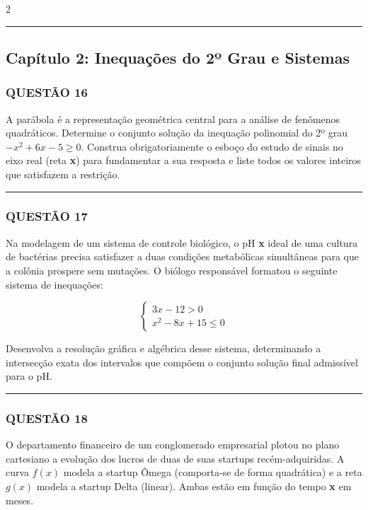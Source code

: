 \documentclass[twoside, 10pt, a4paper]{article}
\begin{document}
\begin{multicols*}{2}
\vspace{0cm} \noindent\textcolor{CorLinha}{\rule{\linewidth}{0.5pt}} \vspace{-0.2cm}
\subsection*{Capítulo 2: Inequações do 2º Grau e Sistemas}
\subsubsection*{QUESTÃO 16}
A parábola é a representação geométrica central para a análise de fenômenos quadráticos. Determine o conjunto solução da inequação polinomial do 2º grau $ -x^2 + 6x - 5 \ge 0 $. Construa obrigatoriamente o esboço do estudo de sinais no eixo real (reta \textbf{x}) para fundamentar a sua resposta e liste todos os valores inteiros que satisfazem a restrição.

\vspace{0cm} \noindent\textcolor{CorLinha}{\rule{\linewidth}{0.5pt}} \vspace{-0.2cm}
\subsubsection*{QUESTÃO 17}
Na modelagem de um sistema de controle biológico, o pH \textbf{x} ideal de uma cultura de bactérias precisa satisfazer a duas condições metabólicas simultâneas para que a colônia prospere sem mutações. O biólogo responsável formatou o seguinte sistema de inequações:

$$ \begin{cases} 3x - 12 > 0 \\ x^2 - 8x + 15 \le 0 \end{cases} $$

Desenvolva a resolução gráfica e algébrica desse sistema, determinando a intersecção exata dos intervalos que compõem o conjunto solução final admissível para o pH.

\vspace{0cm} \noindent\textcolor{CorLinha}{\rule{\linewidth}{0.5pt}} \vspace{-0.2cm}
\subsubsection*{QUESTÃO 18}
O departamento financeiro de um conglomerado empresarial plotou no plano cartesiano a evolução dos lucros de duas de suas startups recém-adquiridas. A curva $ f(x) $ modela a startup Ômega (comporta-se de forma quadrática) e a reta $ g(x) $ modela a startup Delta (linear). Ambas estão em função do tempo \textbf{x} em meses. 


\end{multicols*}
\end{document}
